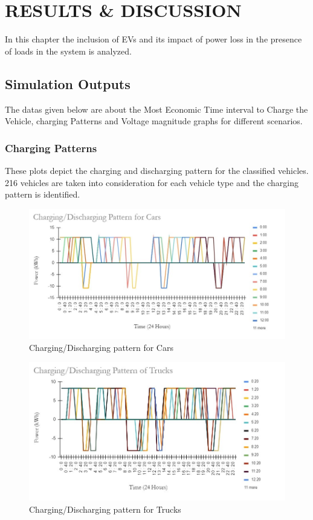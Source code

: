 
	\chapter{RESULTS \& DISCUSSION}
	\label{chap:results}
		In this chapter the inclusion of EVs and its impact of power loss in the presence of loads in the system is analyzed.
		

		
		
		
	\section{Simulation Outputs}
	The datas given below are about the Most Economic Time interval to Charge the Vehicle, charging Patterns and Voltage magnitude graphs for different scenarios.
			\subsection{Charging Patterns}
	These plots depict the charging and discharging pattern for the classified vehicles. 216 vehicles are taken into consideration for each vehicle type and the charging pattern is identified.
	
	
	
	\begin{figure}[!h]
		\centering
		\includegraphics[width=0.7\linewidth]{Figures/cp_case1}
		\caption{Charging/Discharging pattern for Cars}
		\label{fig:cpcase1}
	\end{figure}
	
	\begin{figure}[!h]
		\centering
		\includegraphics[width=0.7\linewidth]{Figures/cp_case2}
		\caption{Charging/Discharging pattern for Trucks}
		\label{fig:cpcase2}
	\end{figure}
	
